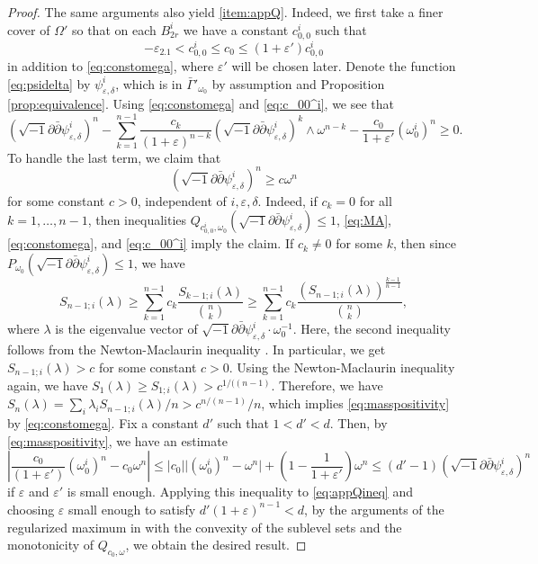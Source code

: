 \documentclass[10pt,a4paper]{amsart}
\numberwithin{equation}{section}
\newcommand{\delb}{\sqrt{-1}\partial\bar{\partial}}
\begin{document}
\begin{proof}
   The same arguments also yield \ref{item:appQ}. Indeed, we first take a finer cover of $\Omega'$ so that on each $B^i_{2r}$ we have a constant $c_{0,0}^i$ such that
   \begin{equation}\label{eq:c_00^i}
       -\varepsilon_{2.1}<c_{0,0}^i\le c_0\le (1+\varepsilon')c_{0,0}^i
   \end{equation}
   in addition to \eqref{eq:constomega}, where $\varepsilon'$ will be chosen later. Denote the function \eqref{eq:psidelta} by $\psi_{\varepsilon,\delta}^i$, which is in $\bar{\Gamma}'_{\omega_0}$ by assumption and Proposition \ref{prop:equivalence}. Using \eqref{eq:constomega} and \eqref{eq:c_00^i}, we see that
   \begin{equation}\label{eq:appQineq}
       (\delb\psi^i_{\varepsilon,\delta})^n-\sum_{k=1}^{n-1}\frac{c_k}{(1+\varepsilon)^{n-k}}(\delb\psi^i_{\varepsilon,\delta})^{k}\wedge\omega^{n-k}-\frac{c_0}{1+\varepsilon'}(\omega_0^i)^n\ge0.
   \end{equation}
   To handle the last term, we claim that
   \begin{equation}\label{eq:masspositivity}
        (\delb \psi^i_{\varepsilon,\delta})^n\ge c\omega^n
    \end{equation}
    for some constant $c>0$, independent of $i,\varepsilon,\delta$. Indeed, if $c_k=0$ for all $k=1,\dots,n-1$, then inequalities $Q_{c_{0,0}^i,\omega_0}(\delb\psi_{\varepsilon,\delta}^i)\le 1$, \eqref{eq:MA}, \eqref{eq:constomega}, and \eqref{eq:c_00^i} imply the claim. If 
    $c_k\neq0$ for some $k$, then since $P_{\omega_0}(\delb \psi^i_{\varepsilon,\delta})\le 1$, we have
    \begin{equation*}
         S_{n-1;i}(\lambda)\ge\sum_{k=1}^{n-1}c_k \frac{S_{k-1;i}(\lambda)}{{n\choose k}}\ge\sum_{k=1}^{n-1}c_k \frac{(S_{n-1;i}(\lambda))^{\frac{k-1}{n-1}}}{{n\choose k}},
    \end{equation*}
    where $\lambda$ is the eigenvalue vector of $\delb \psi^i_{\varepsilon,\delta}\cdot\omega_0^{-1}$. Here, the second inequality follows from the Newton-Maclaurin inequality \cite[Lemma 2.10]{Spr}. 
    In particular, we get $S_{n-1;i}(\lambda)>c$ for some constant $c>0$. Using the Newton-Maclaurin inequality again, we have $S_1(\lambda)\ge S_{1;i}(\lambda)>c^{1/{((n-1)}}$. Therefore, we have $S_n(\lambda)=\sum_i\lambda_i S_{n-1;i}(\lambda)/n>c^{n/(n-1)}/n$, which implies \eqref{eq:masspositivity} by \eqref{eq:constomega}. 
    Fix a constant $d'$ such that $1<d'<d$.
   Then, by \eqref{eq:masspositivity}, we have an estimate
    $$\left\vert \frac{c_0}{(1+\varepsilon')}(\omega_0^i)^n-c_0\omega^n\right\vert\le\vert c_0\vert\vert(\omega^i_0)^n-\omega^n\vert+\left(1-\frac{1}{1+\varepsilon'}\right)\omega^n\le (d'-1)(\delb\psi^i_{\varepsilon,\delta})^n$$
   if $\varepsilon$ and $\varepsilon'$ is small enough. 
   Applying this inequality to \eqref{eq:appQineq} and choosing $\varepsilon$ small enough to satisfy $d'(1+\varepsilon)^{n-1}<d$, by the arguments of the regularized maximum in \cite[p561--562]{GChen} with the convexity of the sublevel sets and the monotonicity of $Q_{c_0,\omega}$, we obtain the desired result.
\end{proof}
\end{document}
